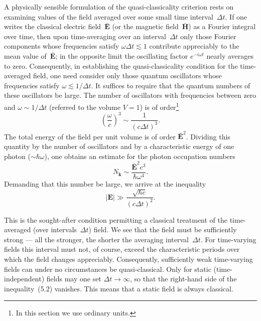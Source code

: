 A physically sensible formulation of the quasi-classicality criterion rests on examining values of the field averaged over some small time interval~$\Delta t$. If one writes the classical electric field~$\bar{\mathbf{E}}$ (or the magnetic field~$\bar{\mathbf{H}}$) as a Fourier integral over time, then upon time-averaging over an interval~$\Delta t$ only those Fourier components whose frequencies satisfy $\omega\Delta t \lesssim 1$ contribute appreciably to the mean value of~$\bar{\mathbf{E}}$; in the opposite limit the oscillating factor $e^{-i\omega t}$ nearly averages to zero. Consequently, in establishing the quasi-classicality condition for the time-averaged field, one need consider only those quantum oscillators whose frequencies satisfy $\omega \lesssim 1/\Delta t$. It suffices to require that the quantum numbers of these oscillators be large.
The number of oscillators with frequencies between zero and $\omega \sim 1/\Delta t$ (referred to the volume $V = 1$) is of order\footnote{In this section we use ordinary units.}
\begin{equation}
\left(\frac{\omega}{c}\right)^3 \sim \frac{1}{(c\Delta t)^3}.
\tag{5.1}
\end{equation}
The total energy of the field per unit volume is of order $\bar{\mathbf{E}}^2$. Dividing this quantity by the number of oscillators and by a characteristic energy of one photon ($\sim \hbar\omega$), one obtains an estimate for the photon occupation numbers
\[
N_\mathbf{k} \sim \frac{\bar{\mathbf{E}}^2 c^3}{\hbar\omega^4}.
\]
Demanding that this number be large, we arrive at the inequality
\begin{equation}
|\mathbf{E}| \gg \frac{\sqrt{\hbar c}}{(c\Delta t)^2}.
\tag{5.2}
\end{equation}

This is the sought-after condition permitting a classical treatment of the time-averaged (over intervals~$\Delta t$) field. We see that the field must be sufficiently strong --- all the stronger, the shorter the averaging interval~$\Delta t$. For time-varying fields this interval must not, of course, exceed the characteristic periods over which the field changes appreciably. Consequently, sufficiently weak time-varying fields can under no circumstances be quasi-classical. Only for static (time-independent) fields may one set $\Delta t \to \infty$, so that the right-hand side of the inequality~(5.2) vanishes. This means that a static field is always classical.

